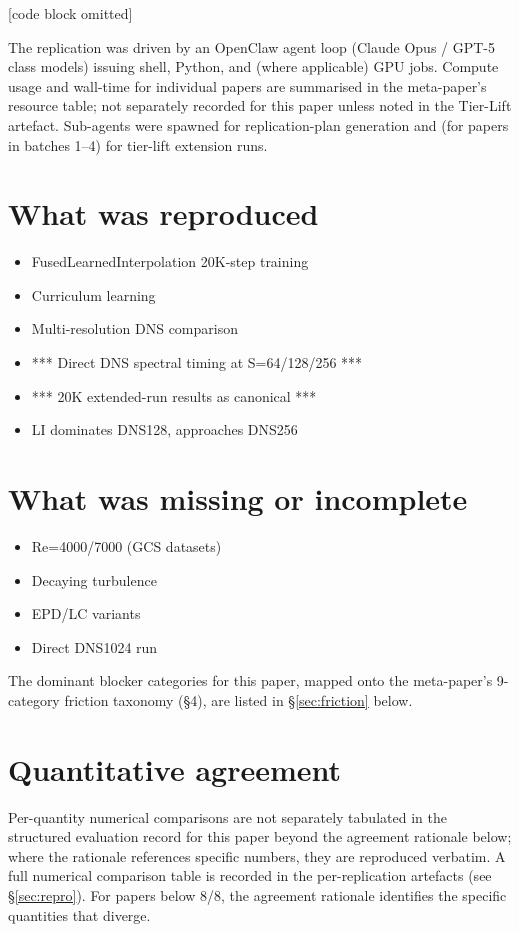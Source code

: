 \documentclass[11pt]{article}
\begin{document}
[code block omitted]
\normalsize

The replication was driven by an OpenClaw agent loop (Claude Opus / GPT-5 class models) issuing shell, Python, and (where applicable) GPU jobs. Compute usage and wall-time for individual papers are summarised in the meta-paper's resource table; not separately recorded for this paper unless noted in the Tier-Lift artefact. Sub-agents were spawned for replication-plan generation and (for papers in batches 1--4) for tier-lift extension runs.

\section{What was reproduced}
\begin{itemize}
\item FusedLearnedInterpolation 20K-step training
\item Curriculum learning
\item Multi-resolution DNS comparison
\item *** Direct DNS spectral timing at S=64/128/256 ***
\item *** 20K extended-run results as canonical ***
\item LI dominates DNS128, approaches DNS256
\end{itemize}

\section{What was missing or incomplete}
\begin{itemize}
\item Re=4000/7000 (GCS datasets)
\item Decaying turbulence
\item EPD/LC variants
\item Direct DNS1024 run
\end{itemize}
The dominant blocker categories for this paper, mapped onto the meta-paper's 9-category friction taxonomy (\S4), are listed in \S\ref{sec:friction} below.

\section{Quantitative agreement}
Per-quantity numerical comparisons are not separately tabulated in the structured evaluation record for this paper beyond the agreement rationale below; where the rationale references specific numbers, they are reproduced verbatim. A full numerical comparison table is recorded in the per-replication artefacts (see \S\ref{sec:repro}). For papers below 8/8, the agreement rationale identifies the specific quantities that diverge.
\end{document}
